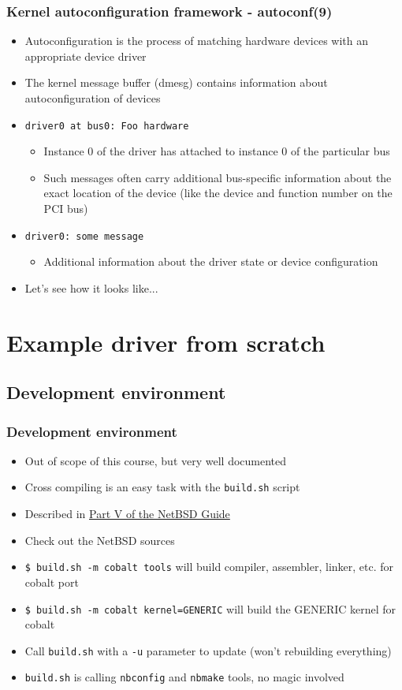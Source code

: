 \documentclass[dvipsnames,table]{beamer}
\begin{document}
\begin{frame}
\frametitle{Kernel autoconfiguration framework - autoconf(9)}
\begin{itemize}
	\item Autoconfiguration is the process of matching hardware devices with an
     appropriate device driver
    \item The kernel message buffer (dmesg) contains information about autoconfiguration of devices
    \item {\tt driver0 at bus0: Foo hardware} 
    \begin{itemize}
    	\item Instance 0 of the driver has attached to instance 0 of the particular bus
		\item Such messages often carry additional bus-specific information about the exact location of the device (like the device and function number on the PCI bus)
	\end{itemize}
    \item {\tt driver0: some message}
    \begin{itemize}
    	\item Additional information about the driver state or device configuration
	\end{itemize}
	\item Let's see how it looks like...
\end{itemize}
\end{frame}

\section{Example driver from scratch}

\subsection{Development environment}

\begin{frame}
\frametitle{Development environment}
\begin{itemize}
	\item Out of scope of this course, but very well documented
	\item Cross compiling is an easy task with the {\tt build.sh} script
	\item Described in \href{http://www.netbsd.org/docs/guide/en/part-compile.html}{Part V of the NetBSD Guide}
	\item Check out the NetBSD sources
	\item {\tt \$ build.sh -m cobalt tools} will build compiler, assembler, linker, etc. for cobalt port
	\item {\tt \$ build.sh -m cobalt kernel=GENERIC} will build the GENERIC kernel for cobalt
	\item Call {\tt build.sh} with a {\tt -u} parameter to update (won't rebuilding everything)
	\item {\tt build.sh} is calling {\tt nbconfig} and {\tt nbmake} tools, no magic involved
\end{itemize}
\end{frame}
\end{document}
